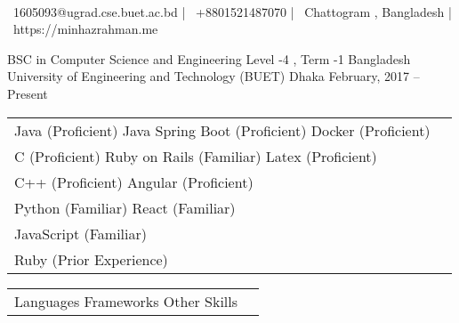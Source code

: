 \documentclass[]{awesome-cv}
\begin{document}
    
\begin{center}
	  \\
	\vspace{2mm}
	{\faEnvelope\ 1605093@ugrad.cse.buet.ac.bd} | {\faMobile\ +8801521487070} | {\faMapMarker\ Chattogram , Bangladesh} | {\faLink\ https://minhazrahman.me}
\end{center}
\begin{cventries}
	\cventry
	{BSC in Computer Science and Engineering \newline Level -4 , Term -1}
	{Bangladesh University of Engineering and Technology (BUET)}
	{Dhaka}
	{February, 2017 – Present}
	{}
\end{cventries}

\vspace{-2mm}

\begin{cventries}
	\cventry
	{\def\arraystretch{1.15}{\begin{tabular}{ l l }
				Java (Proficient) \hspace{4cm} Java Spring Boot (Proficient) \hspace{3.8cm} Docker (Proficient)  & {\skill{ }} \\
				C (Proficient) \hspace{4.7cm} Ruby on Rails (Familiar)  \hspace{4.2cm} Latex (Proficient) & {\skill{ }} \\
				C++ (Proficient) \hspace{4.7cm} Angular (Proficient)  & {\skill{ }} \\
				Python (Familiar) \hspace{4.7cm} React (Familiar)  & {\skill{ }} \\
				JavaScript (Familiar)  & {\skill{ }} \\
				Ruby (Prior Experience)  & {\skill{ }} \\
	\end{tabular}}}
	{\def\arraystretch{1.15}{\begin{tabular}{ l l }
		Languages \hspace{5cm} Frameworks \hspace{5cm} Other Skills  & {\skill{ }} \\
		\end{tabular}}}
	{}
	{}
	{}
	
\end{cventries}
\end{document}
